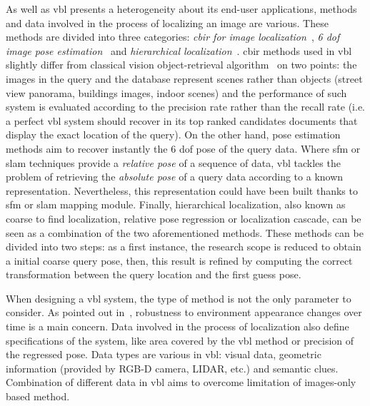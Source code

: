 		As well as \ac{vbl} presents a heterogeneity about its end-user applications, methods and data involved in the process of localizing an image are various. These methods are divided into three categories: \textit{\ac{cbir} for image localization}~\citep{Arandjelovic2012,Radenovic2016,Liu2018}, \textit{6 \ac{dof} image pose estimation}~\citep{Sattler2016a, Brachmann2017b} and \textit{hierarchical localization}~\citep{Sarlin2018a}. \ac{cbir} methods used in \ac{vbl} slightly differ from classical vision object-retrieval algorithm~\citep{Sivic2003} on two points: the images in the query and the database represent scenes rather than objects (\eg street view panorama, buildings images, indoor scenes) and the performance of such system is evaluated according to the precision rate rather than the recall rate (i.e. a perfect \ac{vbl} system should recover in its top ranked candidates documents that display the exact location of the query). On the other hand, pose estimation methods aim to recover instantly the 6 \ac{dof} pose of the query data. Where \ac{sfm} or \ac{slam} techniques provide a \textit{relative pose} of a sequence of data, \ac{vbl} tackles the problem of retrieving the \textit{absolute pose} of a query data according to a known representation. Nevertheless, this representation could have been built thanks to \ac{sfm} or \ac{slam} mapping module. Finally, hierarchical localization, also known as coarse to find localization, relative pose regression or localization cascade, can be seen as a combination of the two aforementioned methods. These methods can be divided into two steps: as a first instance, the research scope is reduced to obtain a initial coarse query pose, then, this result is refined by computing the correct transformation between the query location and the first guess pose.
			
		When designing a \ac{vbl} system, the type of method is not the only parameter to consider. As pointed out in~\citep{Lowry2016}, robustness to environment appearance changes over time is a main concern. Data involved in the process of localization also define specifications of the system, like area covered by the \ac{vbl} method or precision of the regressed pose.  Data types are various in \ac{vbl}: visual data, geometric information (provided by RGB-D camera, LIDAR, etc.) and semantic clues. Combination of different data in \ac{vbl} aims to overcome limitation of images-only based method.
		
